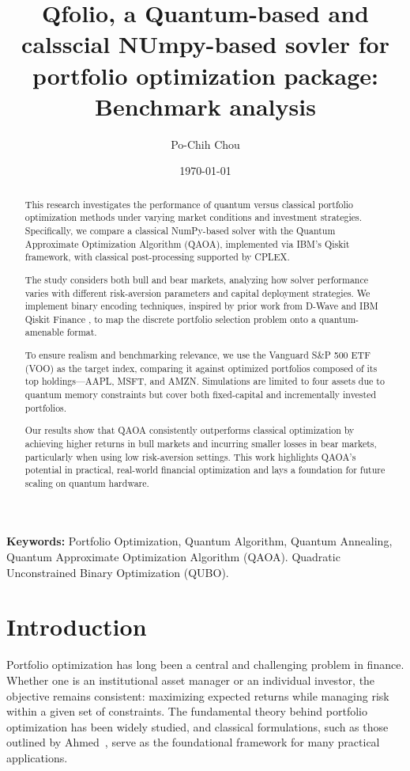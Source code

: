 \documentclass[12pt]{article}
\title{Qfolio, a Quantum-based and calsscial NUmpy-based sovler for portfolio optimization package: Benchmark analysis}
\author[1]{Po-Chih Chou}
\date{\today}
\begin{document}
\maketitle

\tableofcontents
\newpage

\begin{abstract}

This research investigates the performance of quantum versus classical portfolio optimization methods under varying market conditions and investment strategies. Specifically, we compare a classical NumPy-based solver with the Quantum Approximate Optimization Algorithm (QAOA), implemented via IBM's Qiskit framework, with classical post-processing supported by CPLEX.

The study considers both bull and bear markets, analyzing how solver performance varies with different risk-aversion parameters and capital deployment strategies. We implement binary encoding techniques, inspired by prior work from D-Wave \cite{dwave_portfolio} and IBM Qiskit Finance \cite{qiskit_portfolio}, to map the discrete portfolio selection problem onto a quantum-amenable format.

To ensure realism and benchmarking relevance, we use the Vanguard S\&P 500 ETF (VOO) \cite{Vanguard_VOO} as the target index, comparing it against optimized portfolios composed of its top holdings—AAPL, MSFT, and AMZN. Simulations are limited to four assets due to quantum memory constraints but cover both fixed-capital and incrementally invested portfolios.

Our results show that QAOA consistently outperforms classical optimization by achieving higher returns in bull markets and incurring smaller losses in bear markets, particularly when using low risk-aversion settings. This work highlights QAOA’s potential in practical, real-world financial optimization and lays a foundation for future scaling on quantum hardware.

\end{abstract}

\textbf{Keywords:} Portfolio Optimization, Quantum Algorithm, Quantum Annealing, Quantum Approximate Optimization Algorithm (QAOA). Quadratic Unconstrained Binary Optimization (QUBO).

\section{Introduction}

Portfolio optimization has long been a central and challenging problem in finance. Whether one is an institutional asset manager or an individual investor, the objective remains consistent: maximizing expected returns while managing risk within a given set of constraints. The fundamental theory behind portfolio optimization has been widely studied, and classical formulations, such as those outlined by Ahmed~\cite{ahmed2002optimization}, serve as the foundational framework for many practical applications.
\end{document}
